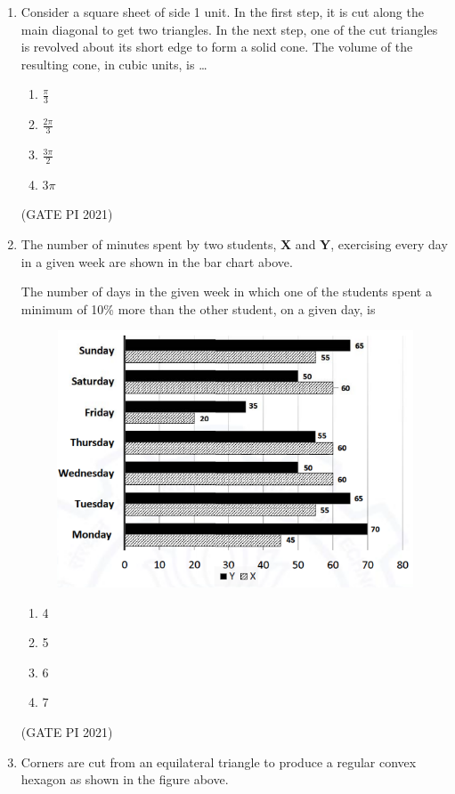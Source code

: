 \documentclass[journal,12pt,onecolumn]{IEEEtran}
\theoremstyle{remark}
\begin{document}
\begin{enumerate}
\item
Consider a square sheet of side 1 unit. In the first step, it is cut along the main diagonal to get two triangles. In the next step, one of the cut triangles is revolved about its short edge to form a solid cone. The volume of the resulting cone, in cubic units, is \dots
\begin{multicols}{4}
\begin{enumerate}
\item $\frac{\pi}{3}$
\item $\frac{2\pi}{3}$
\item $\frac{3\pi}{2}$
\item $3\pi$
\end{enumerate}
\end{multicols}
\hfill (GATE PI 2021)


 \item The number of minutes spent by two students, \textbf{X} and \textbf{Y}, exercising every day in a given week are shown in the bar chart above.\

The number of days in the given week in which one of the students spent a minimum of 10\% more than the other student, on a given day, is

\begin{figure}[H]
    \centering
    \includegraphics[width=0.5\columnwidth]{figs/fig2.png}
    \caption{}
    \label{fig:placeholder}
\end{figure} 


\begin{multicols}{4}
\begin{enumerate}
\item 4
\item 5
\item 6
\item 7
\end{enumerate}
\end{multicols}

\hfill (GATE PI 2021)

\item
Corners are cut from an equilateral triangle to produce a regular convex hexagon as shown in the figure above.


\end{enumerate}
\end{document}

